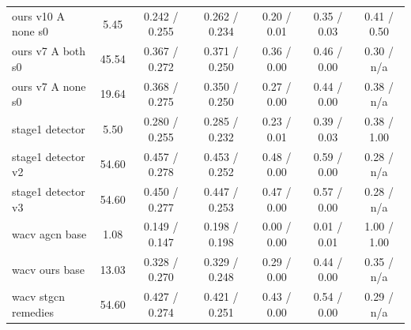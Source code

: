 \begin{tabular}{lcccccc}
\toprule
\midrule
ours v10 A none s0 & 5.45 & 0.242 / 0.255 & 0.262 / 0.234 & 0.20 / 0.01 & 0.35 / 0.03 & 0.41 / 0.50 \\
ours v7 A both s0 & 45.54 & 0.367 / 0.272 & 0.371 / 0.250 & 0.36 / 0.00 & 0.46 / 0.00 & 0.30 / n/a \\
ours v7 A none s0 & 19.64 & 0.368 / 0.275 & 0.350 / 0.250 & 0.27 / 0.00 & 0.44 / 0.00 & 0.38 / n/a \\
stage1 detector & 5.50 & 0.280 / 0.255 & 0.285 / 0.232 & 0.23 / 0.01 & 0.39 / 0.03 & 0.38 / 1.00 \\
stage1 detector v2 & 54.60 & 0.457 / 0.278 & 0.453 / 0.252 & 0.48 / 0.00 & 0.59 / 0.00 & 0.28 / n/a \\
stage1 detector v3 & 54.60 & 0.450 / 0.277 & 0.447 / 0.253 & 0.47 / 0.00 & 0.57 / 0.00 & 0.28 / n/a \\
wacv agcn base & 1.08 & 0.149 / 0.147 & 0.198 / 0.198 & 0.00 / 0.00 & 0.01 / 0.01 & 1.00 / 1.00 \\
wacv ours base & 13.03 & 0.328 / 0.270 & 0.329 / 0.248 & 0.29 / 0.00 & 0.44 / 0.00 & 0.35 / n/a \\
wacv stgcn remedies & 54.60 & 0.427 / 0.274 & 0.421 / 0.251 & 0.43 / 0.00 & 0.54 / 0.00 & 0.29 / n/a \\
\bottomrule
\end{tabular}
